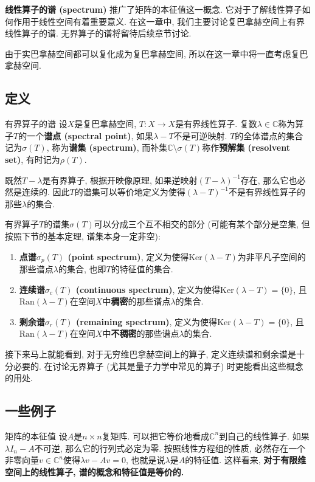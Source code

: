 \textbf{线性算子的谱 (spectrum)} 推广了矩阵的本征值这一概念. 它对于了解线性算子如何作用于线性空间有着重要意义. 在这一章中, 我们主要讨论复巴拿赫空间上有界线性算子的谱. 无界算子的谱将留待后续章节讨论.

由于实巴拿赫空间都可以复化成为复巴拿赫空间, 所以在这一章中将一直考虑复巴拿赫空间.

\subsection{定义}
\begin{definition}{有界算子的谱}
设$X$是复巴拿赫空间, $T:X\to X$是有界线性算子. 复数$\lambda\in\mathbb{C}$称为算子$T$的一个\textbf{谱点 (spectral point)}, 如果$\lambda-T$不是可逆映射. $T$的全体谱点的集合记为$\sigma(T)$, 称为\textbf{谱集 (spectrum)}, 而补集$\mathbb{C}\setminus\sigma(T)$称作\textbf{预解集 (resolvent set)}, 有时记为$\rho(T)$.
\end{definition}

既然$T-\lambda$是有界算子, 根据开映像原理, 如果逆映射$(T-\lambda)^{-1}$存在, 那么它也必然是连续的. 因此$T$的谱集可以等价地定义为使得$(\lambda-T)^{-1}$不是有界线性算子的那些$\lambda$的集合.

有界算子$T$的谱集$\sigma(T)$可以分成三个互不相交的部分 (可能有某个部分是空集, 但按照下节的基本定理, 谱集本身一定非空):

\begin{enumerate}
\item \textbf{点谱$\sigma_p(T)$ (point spectrum)}, 定义为使得$\text{Ker}(\lambda-T)$为非平凡子空间的那些谱点$\lambda$的集合, 也即$T$的特征值的集合.

\item \textbf{连续谱$\sigma_c(T)$ (continuous spectrum)}, 定义为使得$\text{Ker}(\lambda-T)=\{0\}$, 且$\text{Ran}(\lambda-T)$在空间$X$中\textbf{稠密}的那些谱点$\lambda$的集合.

\item \textbf{剩余谱$\sigma_r(T)$ (remaining spectrum)}, 定义为使得$\text{Ker}(\lambda-T)=\{0\}$, 且$\text{Ran}(\lambda-T)$在空间$X$中\textbf{不稠密}的那些谱点$\lambda$的集合.
\end{enumerate}

接下来马上就能看到, 对于无穷维巴拿赫空间上的算子, 定义连续谱和剩余谱是十分必要的. 在讨论无界算子 (尤其是量子力学中常见的算子) 时更能看出这些概念的用处.

\subsection{一些例子}
\begin{example}{矩阵的本征值}
设$A$是$n\times n$复矩阵. 可以把它等价地看成$\mathbb{C}^n$到自己的线性算子. 如果$\lambda I_n-A$不可逆, 那么它的行列式必定为零. 按照线性方程组的性质, 必然存在一个非零向量$v\in \mathbb{C}^n$使得$\lambda v-Av=0$, 也就是说$\lambda$是$A$的特征值. 这样看来, \textbf{对于有限维空间上的线性算子, 谱的概念和特征值是等价的.}
\end{example}

